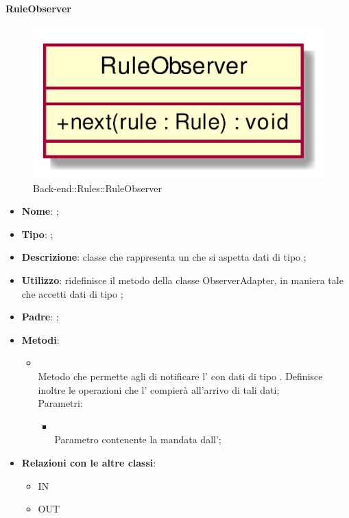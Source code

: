 \hypertarget{RuleObserver_label}{\paragraph{RuleObserver}}
\begin{figure}[h]
	\centering
	\includegraphics[width=\textwidth,height=\textheight,keepaspectratio]{images/ClassRuleObserver.png}
	\caption{Back-end::Rules::RuleObserver}
\end{figure}
\begin{itemize}
	\item \textbf{Nome}: ;
	\item \textbf{Tipo}: ;
	\item \textbf{Descrizione}: classe che rappresenta un  che si aspetta dati di tipo ;
	\item \textbf{Utilizzo}: ridefinisce il metodo  della classe ObserverAdapter, in maniera tale che accetti dati di tipo ;
	\item \textbf{Padre}: ;
	\item \textbf{Metodi}:
	\begin{itemize}
		\item[]  \\
		Metodo che permette agli  di notificare l' con dati di tipo . Definisce inoltre le operazioni che l' compierà all'arrivo di tali dati;\\
		Parametri:
		\begin{itemize}
			\item {} \\
			Parametro contenente la  mandata dall';
		\end{itemize}
	\end{itemize}
	\item \textbf{Relazioni con le altre classi}:
	\begin{itemize}
		\item IN \hyperlink{RuleObservable_label}{}
		\item OUT \hyperlink{Rule_label}{}
	\end{itemize}
\end{itemize}
\FloatBarrier

